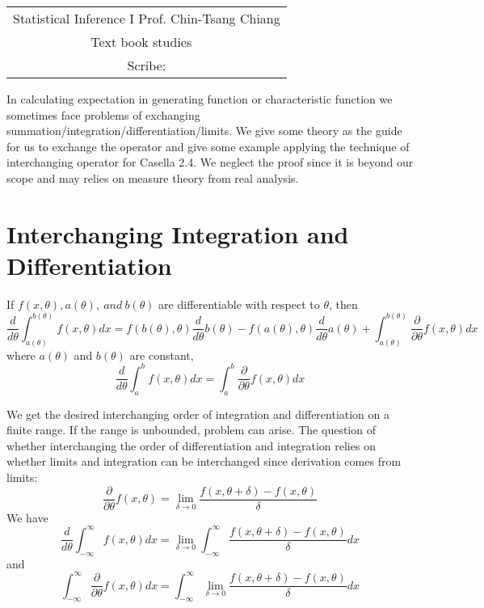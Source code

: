 \documentclass[../Transformation.tex]{subfiles}
\begin{document}
	\begin{center}
		\renewcommand{\arraystretch}{2}
		\begin{bfseries}
			\begin{tabular}{|c|}
				\hline
				Statistical Inference I \hfill Prof. Chin-Tsang Chiang\\
				\hspace{15em} {\large Text book studies} \hspace{15em}\ \\
				\lecdate \hfill Scribe: \scribe\\
				\hline
			\end{tabular}
			\renewcommand{\arraystretch}{1}
		\end{bfseries}
	\end{center}



In calculating expectation in generating function or characteristic function we sometimes face problems of exchanging summation/integration/differentiation/limits. We give some theory as the guide for us to exchange the operator and give some example applying the technique of interchanging operator for Casella 2.4. We neglect the proof since it is beyond our scope and may relies on measure theory from real analysis.
\section{Interchanging Integration and Differentiation}
\begin{theorem}If $f(x,\theta),a(\theta),\ and\ b(\theta)$ are differentiable with respect to $\theta$, then
$$\frac{d}{d\theta}\int_{a(\theta)}^{b(\theta)}f(x,\theta)dx=f(b(\theta),\theta)\frac{d}{d\theta}b(\theta)-f(a(\theta),\theta)\frac{d}{d\theta}a(\theta)+\int_{a(\theta)}^{b(\theta)}\frac{\partial}{\partial\theta}f(x,\theta)dx$$
where $a(\theta)$ and $b(\theta)$ are constant,
$$\frac{d}{d\theta}\int_a^bf(x,\theta)dx=\int_a^b\frac{\partial}{\partial\theta}f(x,\theta)dx$$
\end{theorem}
We get the desired interchanging order of integration and differentiation on a finite range. If the range is unbounded, problem can arise. The question of whether interchanging the order of differentiation and integration relies on whether limits and integration can be interchanged since derivation comes from limits:
$$\frac{\partial}{\partial\theta}f(x,\theta)=\lim_{\delta\rightarrow0}\frac{f(x,\theta+\delta)-f(x,\theta)}{\delta}$$ We have
$$\frac{d}{d\theta}\int_{-\infty}^{\infty}f(x,\theta)dx=\lim_{\delta\rightarrow0}\int_{-\infty}^{\infty}\frac{f(x,\theta+\delta)-f(x,\theta)}{\delta}dx$$
and $$\int_{-\infty}^{\infty}\frac{\partial}{\partial\theta}f(x,\theta)dx=\int_{-\infty}^{\infty}\lim_{\delta\rightarrow0}\frac{f(x,\theta+\delta)-f(x,\theta)}{\delta}dx$$
\end{document}
